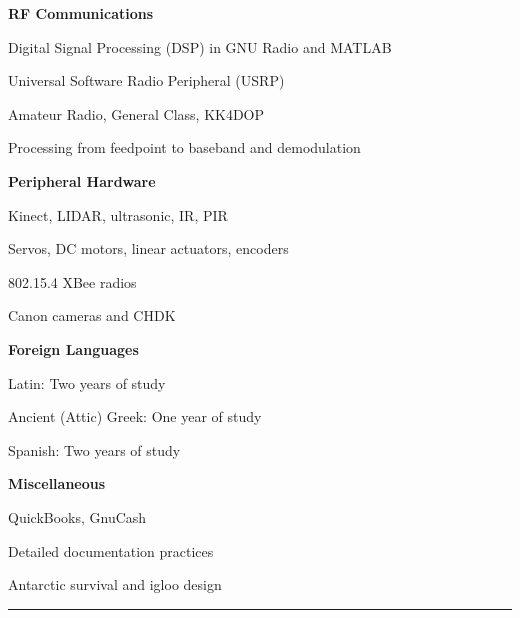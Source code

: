 \documentclass[10pt,letterpaper]{article}
\begin{document}
\begin{itemize*}
\begin{itemize*}
        \end{itemize*}
    \item \textbf{RF Communications}
        \begin{itemize*}
            \item Digital Signal Processing (DSP) in GNU Radio and MATLAB
            \item Universal Software Radio Peripheral (USRP)
            \item Amateur Radio, General Class, KK4DOP
            \item Processing from feedpoint to baseband and demodulation
        \end{itemize*}
    \item \textbf{Peripheral Hardware}
        \begin{itemize*}
            \item Kinect, LIDAR, ultrasonic, IR, PIR
            \item Servos, DC motors, linear actuators, encoders
            \item 802.15.4 XBee radios
            \item Canon cameras and CHDK
        \end{itemize*}
    \item \textbf{Foreign Languages}
        \begin{itemize*}
            \item Latin: Two years of study
            \item Ancient (Attic) Greek: One year of study
            \item Spanish: Two years of study
        \end{itemize*}
    \item \textbf{Miscellaneous}
        \begin{itemize*}
            \item QuickBooks, GnuCash
            \item Detailed documentation practices
            \item Antarctic survival and igloo design
        \end{itemize*}
\end{itemize*}

\hrule
\vspace{-0.4em}
\end{document}
